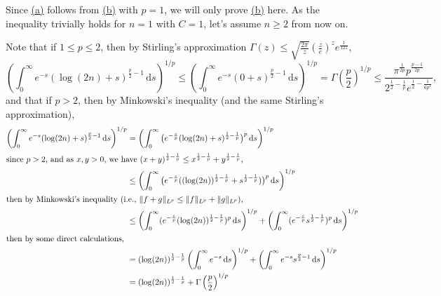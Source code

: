 \begin{answer}
	Since \hyperref[ex5.4.13:a]{(a)} follows from \hyperref[ex5.4.13:b]{(b)} with \(p=1\), we will only prove \hyperref[ex5.4.13:b]{(b)} here. As the inequality trivially holds for \(n=1\) with \(C=1\), let's assume \(n\geq 2\) from now on.

	Note that if \(1 \leq p \leq 2\), then by Stirling's approximation \(\Gamma(z) \leq \sqrt{\frac{2\pi}{z}} \left( \frac{z}{e} \right)^{z} e^{\frac{1}{12z}}\),
	\[
		\left( \int_{0}^{\infty} e^{-s}(\log(2n)+s)^{\frac{p}{2} - 1}\,\mathrm{d} s \right) ^{1 / p}
		\leq \left( \int_{0}^{\infty} e^{-s}(0+s)^{\frac{p}{2} - 1}\,\mathrm{d} s \right) ^{1 / p}
		= \Gamma \left( \frac{p}{2} \right) ^{1 / p}
		\leq \frac{\pi^{\frac{1}{2p}} p^{\frac{p-1}{2p}}}{2^{\frac{1}{2} - \frac{1}{p}} e^{\frac{1}{2} - \frac{1}{6 p^2}}},
	\]
	and that if \(p>2\), then by Minkowski's inequality (and the same Stirling's approximation),
	\begin{align*}
		\left( \int_{0}^{\infty} e^{-s}(\log(2n)+s)^{\frac p2-1}\,\mathrm{d} s \right)^{1 / p}
		 & =\left( \int_{0}^{\infty} \big( e^{-\frac{s}{p}} (\log(2n)+s)^{\frac{1}{2} - \frac{1}{p}}\big)^{p} \,\mathrm{d} s \right)^{1 / p}                                                                                                    \\
		\shortintertext{since \(p > 2\), and as \(x, y > 0\), we have \((x + y)^{\frac{1}{2} - \frac{1}{p}}\leq x^{\frac{1}{2} - \frac{1}{p}} + y^{\frac{1}{2} - \frac{1}{p}}\),}
		 & \leq \left( \int_{0}^{\infty} \big( e^{-\frac{s}{p}} ((\log(2n))^{\frac{1}{2} - \frac{1}{p}} + s^{\frac{1}{2} - \frac{1}{p}}) \big)^{p} \,\mathrm{d} s \right) ^{1 / p}                                                              \\
		\shortintertext{then by Minkowski's inequality (i.e., \(\lVert f + g \rVert _{L^p} \leq \lVert f \rVert _{L^p} + \lVert g \rVert _{L^p}\)),}
		 & \leq \left( \int_{0}^{\infty} (e^{-\frac{s}{p}}(\log(2n))^{\frac{1}{2}-\frac{1}{p}})^p \,\mathrm{d} s \right)^{1 / p} + \left( \int_{0}^{\infty} (e^{-\frac{s}{p}} s^{\frac{1}{2} - \frac{1}{p}})^{p} \,\mathrm{d} s \right)^{1 / p} \\
		\shortintertext{then by some direct calculations,}
		 & = (\log(2n))^{\frac{1}{2} - \frac{1}{p}} \left( \int_{0}^{\infty} e^{-s} \,\mathrm{d} s \right)^{1 / p} + \left( \int_{0}^{\infty} e^{-s} s^{\frac{p}{2} - 1} \,\mathrm{d} s \right)^{1 / p}                                         \\
		 & = (\log(2n))^{\frac{1}{2} - \frac{1}{p}} + \Gamma\left( \frac{p}{2} \right) ^{1 / p}                                                                                                                                                 \\

\end{align*}
\end{answer}
